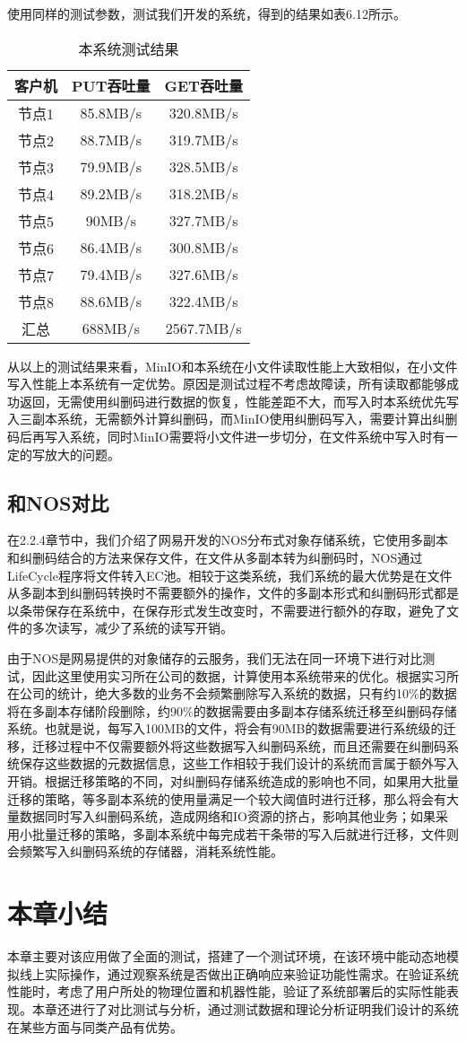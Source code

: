 使用同样的测试参数，测试我们开发的系统，得到的结果如表6.12所示。

\begin{table}[h]
    \centering
    \caption{本系统测试结果}
    \begin{tabular}{ccc}
      \toprule
      客户机   & PUT吞吐量  & GET吞吐量 \\
      \midrule
      节点1  & 85.8MB/s  & 320.8MB/s \\
      节点2  & 88.7MB/s  & 319.7MB/s \\
      节点3  & 79.9MB/s  & 328.5MB/s \\
      节点4  & 89.2MB/s  & 318.2MB/s \\
      节点5  & 90MB/s    & 327.7MB/s \\
      节点6  & 86.4MB/s  & 300.8MB/s \\
      节点7  & 79.4MB/s  & 327.6MB/s \\
      节点8  & 88.6MB/s  & 322.4MB/s \\
      汇总   & 688MB/s   & 2567.7MB/s \\
      \bottomrule
    \end{tabular}
\end{table}

从以上的测试结果来看，MinIO和本系统在小文件读取性能上大致相似，在小文件写入性能上本系统有一定优势。原因是测试过程不考虑故障读，所有读取都能够成功返回，无需使用纠删码进行数据的恢复，性能差距不大，而写入时本系统优先写入三副本系统，无需额外计算纠删码，而MinIO使用纠删码写入，需要计算出纠删码后再写入系统，同时MinIO需要将小文件进一步切分，在文件系统中写入时有一定的写放大的问题。

\subsection{和NOS对比}%
在2.2.4章节中，我们介绍了网易开发的NOS分布式对象存储系统，它使用多副本和纠删码结合的方法来保存文件，在文件从多副本转为纠删码时，NOS通过LifeCycle程序将文件转入EC池。相较于这类系统，我们系统的最大优势是在文件从多副本到纠删码转换时不需要额外的操作，文件的多副本形式和纠删码形式都是以条带保存在系统中，在保存形式发生改变时，不需要进行额外的存取，避免了文件的多次读写，减少了系统的读写开销。

由于NOS是网易提供的对象储存的云服务，我们无法在同一环境下进行对比测试，因此这里使用实习所在公司的数据，计算使用本系统带来的优化。根据实习所在公司的统计，绝大多数的业务不会频繁删除写入系统的数据，只有约10$\%$的数据将在多副本存储阶段删除，约90$\%$的数据需要由多副本存储系统迁移至纠删码存储系统。也就是说，每写入100MB的文件，将会有90MB的数据需要进行系统级的迁移，迁移过程中不仅需要额外将这些数据写入纠删码系统，而且还需要在纠删码系统保存这些数据的元数据信息，这些工作相较于我们设计的系统而言属于额外写入开销。根据迁移策略的不同，对纠删码存储系统造成的影响也不同，如果用大批量迁移的策略，等多副本系统的使用量满足一个较大阈值时进行迁移，那么将会有大量数据同时写入纠删码系统，造成网络和IO资源的挤占，影响其他业务；如果采用小批量迁移的策略，多副本系统中每完成若干条带的写入后就进行迁移，文件则会频繁写入纠删码系统的存储器，消耗系统性能。

\section{本章小结}%
本章主要对该应用做了全面的测试，搭建了一个测试环境，在该环境中能动态地模拟线上实际操作，通过观察系统是否做出正确响应来验证功能性需求。在验证系统性能时，考虑了用户所处的物理位置和机器性能，验证了系统部署后的实际性能表现。本章还进行了对比测试与分析，通过测试数据和理论分析证明我们设计的系统在某些方面与同类产品有优势。
